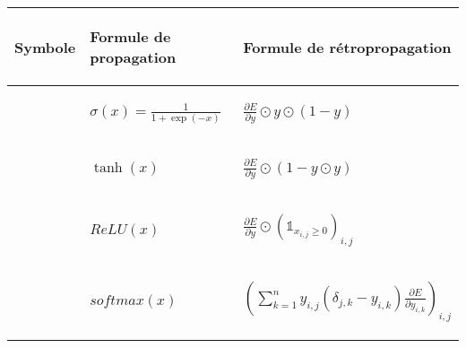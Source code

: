 \begin{center}
\begin{tabular}{|m{3.5cm}|m{2.7cm}|m{4.5cm}|}
\hline
\begin{center}Symbole\end{center} & \begin{center}Formule de propagation\end{center} & \begin{center}Formule de rétropropagation\end{center} \\
\hline
\begin{center}\end{center} & \begin{center}$\sigma(x) = \frac{1}{1 + \exp(-x)}$\end{center} & \begin{center}$\frac{\partial E}{\partial y} \odot y \odot (1 - y)$\end{center} \\
\hline
\begin{center}\end{center} & \begin{center}$\tanh(x)$\end{center} & \begin{center}$\frac{\partial E}{\partial y} \odot (1 - y \odot y)$\end{center} \\ 
\hline
\begin{center}\end{center} & \begin{center}$ReLU(x)$\end{center} & \begin{center}$\frac{\partial E}{\partial y} \odot (\mathds{1}_{x_{i,j} \geq 0})_{i,j}$\end{center} \\ 
\hline
\begin{center}\end{center} & \begin{center}$softmax(x)$\end{center} & \begin{center}$\left(\sum_{k = 1}^{n}{y_{i,j}(\delta_{j,k} - y_{i,k})\frac{\partial E}{\partial y_{i, k}}}\right)_{i,j}$\end{center} \\ 

\end{tabular}
\end{center}
